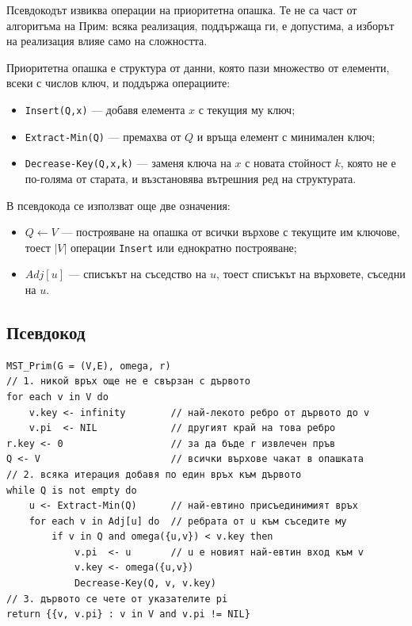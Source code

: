 Псевдокодът извиква операции на приоритетна опашка. Те не са част от алгоритъма на Прим: всяка реализация, поддържаща ги, е допустима, а изборът на реализация влияе само на сложността.

\begin{defn}
Приоритетна опашка е структура от данни, която пази множество от елементи, всеки с числов ключ, и поддържа операциите:

\begin{itemize}
\item \verb|Insert(Q,x)| --- добавя елемента $x$ с текущия му ключ;
\item \verb|Extract-Min(Q)| --- премахва от $Q$ и връща елемент с минимален ключ;
\item \verb|Decrease-Key(Q,x,k)| --- заменя ключа на $x$ с новата стойност $k$, която не е по-голяма от старата, и възстановява вътрешния ред на структурата.
\end{itemize}
\end{defn}

В псевдокода се използват още две означения:

\begin{itemize}
\item $Q\leftarrow V$ --- построяване на опашка от всички върхове с текущите им ключове, тоест $|V|$ операции \verb|Insert| или еднократно построяване;
\item $\mathit{Adj}[u]$ --- списъкът на съседство на $u$, тоест списъкът на върховете, съседни на $u$.
\end{itemize}

\subsection{Псевдокод}\label{s:7.3.3}

\begin{verbatim}
MST_Prim(G = (V,E), omega, r)
// 1. никой връх още не е свързан с дървото
for each v in V do
    v.key <- infinity        // най-лекото ребро от дървото до v
    v.pi  <- NIL             // другият край на това ребро
r.key <- 0                   // за да бъде r извлечен пръв
Q <- V                       // всички върхове чакат в опашката
// 2. всяка итерация добавя по един връх към дървото
while Q is not empty do
    u <- Extract-Min(Q)      // най-евтино присъединимият връх
    for each v in Adj[u] do  // ребрата от u към съседите му
        if v in Q and omega({u,v}) < v.key then
            v.pi  <- u       // u е новият най-евтин вход към v
            v.key <- omega({u,v})
            Decrease-Key(Q, v, v.key)
// 3. дървото се чете от указателите pi
return {{v, v.pi} : v in V and v.pi != NIL}
\end{verbatim}

